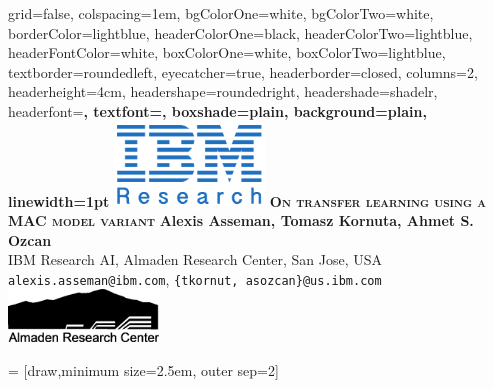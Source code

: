 \documentclass[final,paperwidth=36in,paperheight=48in,portrait,fontscale=0.3]{baposter}
\begin{document}
\begin{poster}%
  {
  grid=false,
  colspacing=1em,
  bgColorOne=white,
  bgColorTwo=white,
  borderColor=lightblue,
  headerColorOne=black,
  headerColorTwo=lightblue,
  headerFontColor=white,
  boxColorOne=white,
  boxColorTwo=lightblue,
  textborder=roundedleft,
  eyecatcher=true,
  headerborder=closed,
  columns=2,
  headerheight=4cm,
  headershape=roundedright,
  headershade=shadelr,
  headerfont=\Large\bf\textsc, %
  textfont={\setlength{\parindent}{1.5em}\large},
  boxshade=plain,
  background=plain,
  linewidth=1pt
  } 
  { %
\includegraphics[width=4cm]{../img/ibm_research.png}
  } 
  	{\bf\textsc{On transfer learning using a MAC model variant}\vspace{0.2em}}
  {
	\textbf{Alexis Asseman, Tomasz Kornuta, Ahmet S. Ozcan}\\
	IBM Research AI, Almaden Research Center, San Jose, USA\\
	\texttt{alexis.asseman@ibm.com}, \texttt{\{tkornut, asozcan\}@us.ibm.com}\\
  }
  { %
\includegraphics[width=4cm]{../img/arc_logo.png}
  }


\newcommand{\colouredcircle}{%
\tikz{\useasboundingbox (-0.2em,-0.32em) rectangle(0.2em,0.32em); \draw[draw=black,fill=lightblue,line width=0.03em] (0,0) circle(0.16em);}}
 = [draw,minimum size=2.5em, outer sep=2]




\end{poster}
\end{document}
